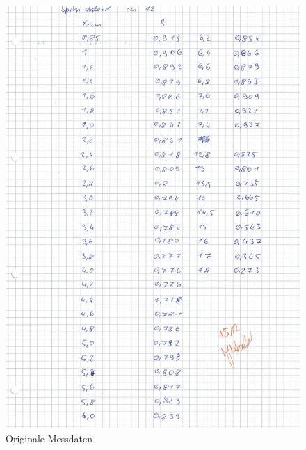 \begin{figure}[h!]
  \centering
  \includegraphics[width=\textwidth]{OMD7.pdf}
  \caption{Originale Messdaten}
  \label{fig:OMD7}
\end{figure}



